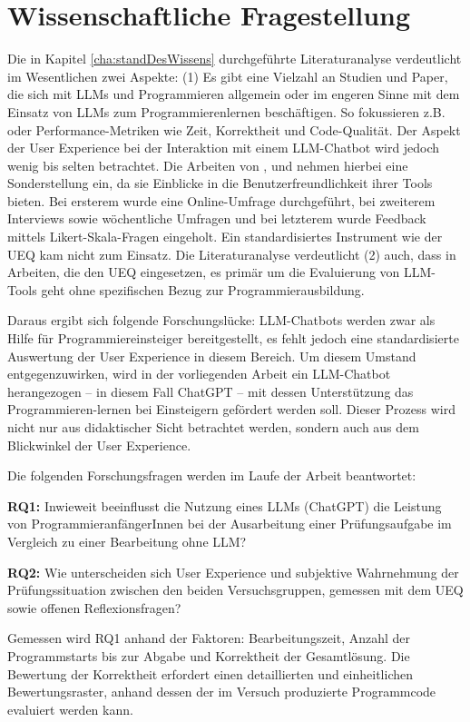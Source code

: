 

\section{Wissenschaftliche Fragestellung} \label{cha:wissenschaftlicheFragestellung}

Die in Kapitel \ref{cha:standDesWissens} durchgeführte Literaturanalyse verdeutlicht im Wesentlichen zwei Aspekte: (1) Es gibt eine Vielzahl an Studien und Paper, die sich mit LLMs und Programmieren allgemein oder im engeren Sinne mit dem Einsatz von LLMs zum Programmierenlernen beschäftigen. So fokussieren z.B. \textcite{RobotsAreComming} oder \textcite{KazemitabaarSupportLearners2023} Performance-Metriken wie Zeit, Korrektheit und Code-Qualität. Der Aspekt der User Experience bei der Interaktion mit einem LLM-Chatbot wird jedoch wenig bis selten betrachtet. Die Arbeiten von \textcite{CodeHelp}, \textcite{KazemitabaarCodeAid} und \textcite{KazemitabaarSupportLearners2023} nehmen hierbei eine Sonderstellung ein, da sie Einblicke in die Benutzerfreundlichkeit ihrer Tools bieten. Bei ersterem wurde eine Online-Umfrage durchgeführt, bei zweiterem Interviews sowie wöchentliche Umfragen und bei letzterem wurde Feedback mittels Likert-Skala-Fragen eingeholt. Ein standardisiertes Instrument wie der UEQ kam nicht zum Einsatz. Die Literaturanalyse verdeutlicht (2) auch, dass in Arbeiten, die den UEQ eingesetzen, es primär um die Evaluierung von LLM-Tools geht ohne spezifischen Bezug zur Programmierausbildung.

Daraus ergibt sich folgende Forschungslücke: LLM-Chatbots werden zwar als Hilfe für Programmiereinsteiger bereitgestellt, es fehlt jedoch eine standardisierte Auswertung der User Experience in diesem Bereich. Um diesem Umstand entgegenzuwirken, wird in der vorliegenden Arbeit ein LLM-Chatbot herangezogen -- in diesem Fall ChatGPT -- mit dessen Unterstützung das Programmieren-lernen bei Einsteigern gefördert werden soll. Dieser Prozess wird nicht nur aus didaktischer Sicht betrachtet werden, sondern auch aus dem Blickwinkel der User Experience.

Die folgenden Forschungsfragen werden im Laufe der Arbeit beantwortet:

\textbf{RQ1:} Inwieweit beeinflusst die Nutzung eines LLMs (ChatGPT) die Leistung von ProgrammieranfängerInnen bei der Ausarbeitung einer Prüfungsaufgabe im Vergleich zu einer Bearbeitung ohne LLM?

\textbf{RQ2:} Wie unterscheiden sich User Experience und subjektive Wahrnehmung der Prüfungssituation zwischen den beiden Versuchsgruppen, gemessen mit dem UEQ sowie offenen Reflexionsfragen?

Gemessen wird RQ1 anhand der Faktoren: Bearbeitungszeit, Anzahl der Programmstarts bis zur Abgabe und Korrektheit der Gesamtlösung. Die Bewertung der Korrektheit erfordert einen detaillierten und einheitlichen Bewertungsraster, anhand dessen der im Versuch produzierte Programmcode evaluiert werden kann.